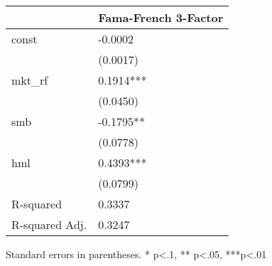 \begin{table}
\caption{}
\label{}
\begin{center}
\begin{tabular}{ll}
\hline
               & Fama-French 3-Factor  \\
\hline
const          & -0.0002               \\
               & (0.0017)              \\
mkt\_rf        & 0.1914***             \\
               & (0.0450)              \\
smb            & -0.1795**             \\
               & (0.0778)              \\
hml            & 0.4393***             \\
               & (0.0799)              \\
R-squared      & 0.3337                \\
R-squared Adj. & 0.3247                \\
\hline
\end{tabular}
\end{center}
\end{table}
\bigskip
Standard errors in parentheses. \newline 
* p<.1, ** p<.05, ***p<.01